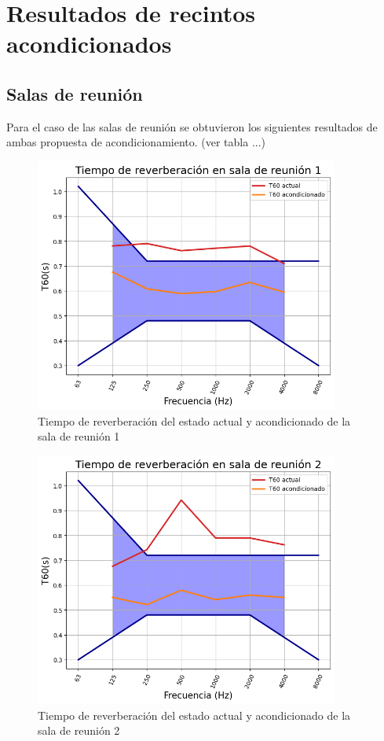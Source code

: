 \section{Resultados de recintos acondicionados}
\subsection{Salas de reunión}
Para el caso de las salas de reunión se obtuvieron los siguientes resultados de ambas propuesta de acondicionamiento. (ver tabla ...)
\begin{figure}[H]
    \centering
    \includegraphics[width=10cm]{Imagenes/DIN/DIN sala reunion 1 comparacion.png}
    \caption{Tiempo de reverberación del estado actual y acondicionado de la sala de reunión 1}
    \label{fig: Ttarger sala_reunion 1 acond}
\end{figure}
\begin{figure}[H]
    \centering
    \includegraphics[width=10cm]{Imagenes/DIN/DIN sala reunion 2 comparacion.png}
    \caption{Tiempo de reverberación del estado actual y acondicionado de la sala de reunión 2}
    \label{fig: Ttarger sala_reunion 2 acond}
\end{figure}

